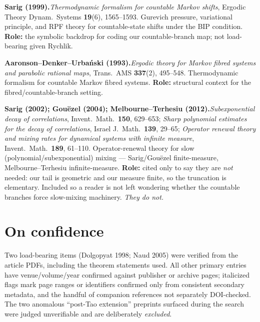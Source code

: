 \documentclass[11pt]{article}
\newcommand{\entry}[2]{\medskip\noindent\textbf{#1}\quad #2\par}
\begin{document}
\entry{Sarig (1999).}{\emph{Thermodynamic formalism for countable Markov shifts},
Ergodic Theory Dynam.\ Systems \textbf{19}(6), 1565--1593. Gurevich pressure,
variational principle, and RPF theory for countable-state shifts under the BIP
condition. \textbf{Role:} the symbolic backdrop for coding our countable-branch
map; not load-bearing given Rychlik.}

\entry{Aaronson--Denker--Urba\'nski (1993).}{\emph{Ergodic theory for Markov
fibred systems and parabolic rational maps}, Trans.\ AMS \textbf{337}(2),
495--548. Thermodynamic formalism for countable Markov fibred systems.
\textbf{Role:} structural context for the fibred/countable-branch setting.}

\entry{Sarig (2002); Gou\"ezel (2004); Melbourne--Terhesiu (2012).}{\emph{Subexponential
decay of correlations}, Invent.\ Math.\ \textbf{150}, 629--653; \emph{Sharp
polynomial estimates for the decay of correlations}, Israel J.\ Math.\ \textbf{139},
29--65; \emph{Operator renewal theory and mixing rates for dynamical systems with
infinite measure}, Invent.\ Math.\ \textbf{189}, 61--110. Operator-renewal theory
for slow (polynomial/subexponential) mixing --- Sarig/Gou\"ezel finite-measure,
Melbourne--Terhesiu infinite-measure. \textbf{Role:} cited only to say they are
\emph{not} needed: our tail is geometric and our measure finite, so the
truncation is elementary. Included so a reader is not left wondering whether the
countable branches force slow-mixing machinery. \emph{They do not.}}

\section*{On confidence}
Two load-bearing items (Dolgopyat 1998; Naud 2005) were verified from the
article PDFs, including the theorem statements used. All other primary entries
have venue/volume/year confirmed against publisher or archive pages; italicized
flags mark page ranges or identifiers confirmed only from consistent secondary
metadata, and the handful of companion references not separately DOI-checked.
The two anomalous ``post-Tao extension'' preprints surfaced during the search
were judged unverifiable and are deliberately \emph{excluded}.
\end{document}
